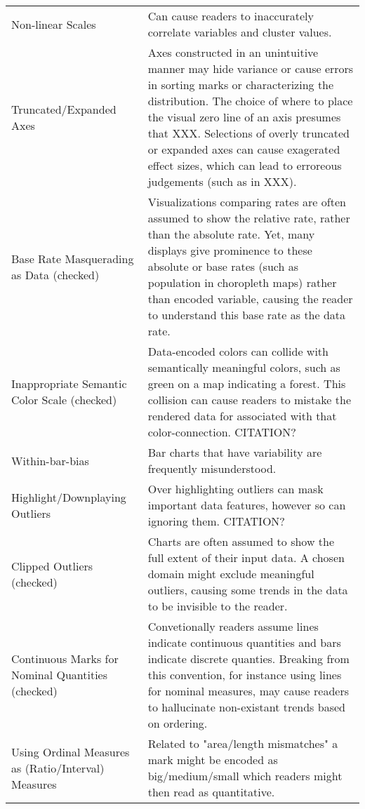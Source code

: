 \begin{longtable}{p{5cm}p{12cm}}
 \rowcolor{colorc-opaque}Non-linear Scales & Can cause readers to inaccurately correlate variables and cluster values. \cite{pandey2015deceptive}\\
 \rowcolor{colorc}Truncated/Expanded Axes & Axes constructed in an unintuitive manner may hide variance or cause errors in sorting marks or characterizing the distribution.  The choice of where to place the visual zero line of an axis presumes that XXX. Selections of overly truncated or expanded axes can cause exagerated effect sizes, which can lead to erroreous judgements (such as in XXX).  \cite{pandey2015deceptive, correll2017black, cleveland1982variables, ritchie2019lie, correll2019truncating}\\
 \rowcolor{colorc-opaque}Base Rate Masquerading as Data (checked) & Visualizations comparing rates are often assumed to show the relative rate, rather than the absolute rate. Yet, many displays give prominence to these absolute or base rates (such as population in choropleth maps) rather than encoded variable, causing the reader to understand this base rate as the data rate.  \cite{correll2016surprise}\\
 \rowcolor{colorc}Inappropriate Semantic Color Scale (checked) & Data-encoded colors can collide with semantically meaningful colors, such as green on a map indicating a forest. This collision can cause readers to mistake the rendered data for associated with that color-connection. CITATION?\\
 \rowcolor{colorc-opaque}Within-bar-bias & Bar charts that have variability are frequently misunderstood. \cite{newman2012bar}\\
 \rowcolor{colorc}Highlight/Downplaying Outliers & Over highlighting outliers can mask important data features, however so can ignoring them. CITATION?\\
 \rowcolor{colorc-opaque}Clipped Outliers (checked) & Charts are often assumed to show the full extent of their input data. A chosen domain might exclude meaningful outliers, causing some trends in the data to be invisible to the reader. \\
 \rowcolor{colorc}Continuous Marks for Nominal Quantities (checked) & Convetionally readers assume lines indicate continuous quantities and bars indicate discrete quanties. Breaking from this convention, for instance using lines for nominal measures, may cause readers to hallucinate non-existant trends based on ordering.  \cite{mcnuttlinting, zacks1999bars}\\
 \rowcolor{colorc-opaque}Using Ordinal Measures as (Ratio/Interval) Measures & Related to "area/length mismatches" a mark might be encoded as big/medium/small which readers might then read as quantitative. \cite{stevens1946theory, few2019loom}\\

\end{longtable}
